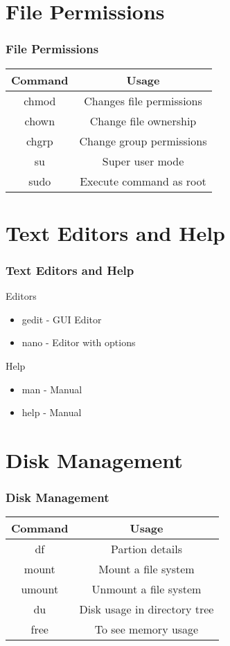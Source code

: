 \documentclass{beamer}
\begin{document}
\section{File Permissions}
\begin{frame}
  \frametitle{File Permissions}

  \begin{tabular}{|c|c|}
\hline
    \textbf{Command} & \textbf{Usage}\\
\hline
    chmod & Changes file permissions\\
\hline
	chown & Change file ownership \\
\hline
	chgrp & Change group permissions\\
\hline
	su & Super user mode\\
\hline
	sudo & Execute command as root\\

\hline
\end{tabular}

\end{frame}

\section{Text Editors and Help}
\begin{frame}
  \frametitle{Text Editors and Help}
 \begin{block}{Editors}
  \begin{itemize}
      \item gedit - GUI Editor
      \item nano - Editor with options
    \end{itemize}
	\end{block}
	\begin{block}{Help}
	\begin{itemize}
      \item man - Manual
      \item help - Manual
    \end{itemize}
\end{block}
\end{frame}


\section{Disk Management}
\begin{frame}
  \frametitle{Disk Management}

  \begin{tabular}{|c|c|}
  \hline
    \textbf{Command} & \textbf{Usage}\\
\hline
    df & Partion details \\
\hline
    mount & Mount a file system\\
\hline
	 umount & Unmount a file system\\
\hline
	du &  Disk usage in directory tree\\
\hline
	free & To see memory usage\\
\hline
\end{tabular}

\end{frame}
\end{document}
